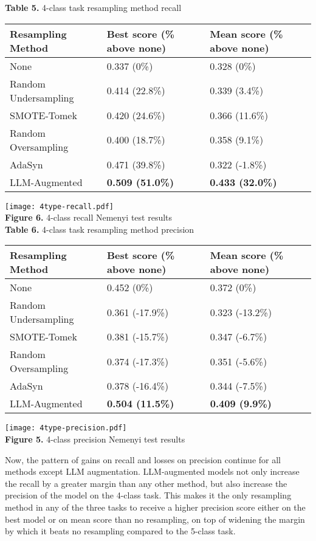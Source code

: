 \documentclass[runningheads]{llncs}
\newenvironment{nscenter}
 {\parskip=0pt\par\nopagebreak\centering}
 {\par\noindent\ignorespacesafterend}
\begin{document}
\begin{nscenter}
{\bf Table 5.} 4-class task resampling method recall\\

\begin{tabular}{|l|l|l|}
\hline
Resampling Method & Best score (\% above none) & Mean score (\% above none) \\\hline
None & 0.337 (0\%) & 0.328 (0\%) \\\hline
Random Undersampling & 0.414 (22.8\%) & 0.339 (3.4\%) \\\hline
SMOTE-Tomek & 0.420 (24.6\%) & 0.366 (11.6\%) \\\hline
Random Oversampling & 0.400 (18.7\%) & 0.358 (9.1\%) \\\hline
AdaSyn & 0.471 (39.8\%) & 0.322 (-1.8\%) \\\hline
LLM-Augmented & {\bf 0.509 (51.0\%)} & {\bf 0.433 (32.0\%)} \\\hline
\end{tabular}

\texttt{[image: 4type-recall.pdf]}\\
{\bf Figure 6.} 4-class recall Nemenyi test results\\
\vspace{\baselineskip}
{\bf Table 6.} 4-class task resampling method precision\\

\begin{tabular}{|l|l|l|}
\hline
Resampling Method & Best score (\% above none) & Mean score (\% above none) \\\hline
None & 0.452 (0\%) & 0.372 (0\%) \\\hline
Random Undersampling & 0.361 (-17.9\%) & 0.323 (-13.2\%) \\\hline
SMOTE-Tomek & 0.381 (-15.7\%) & 0.347 (-6.7\%) \\\hline
Random Oversampling & 0.374 (-17.3\%) & 0.351 (-5.6\%) \\\hline
AdaSyn & 0.378 (-16.4\%) & 0.344 (-7.5\%) \\\hline
LLM-Augmented & {\bf 0.504 (11.5\%)} & {\bf 0.409 (9.9\%)} \\\hline
\end{tabular}

\texttt{[image: 4type-precision.pdf]}\\
{\bf Figure 5.} 4-class precision Nemenyi test results
\end{nscenter}
Now, the pattern of gains on recall and losses on precision continue for all methods except LLM augmentation. LLM-augmented models not only increase the recall by a greater margin than any other method, but also increase the precision of the model on the 4-class task. This makes it the only resampling method in any of the three tasks to receive a higher precision score either on the best model or on mean score than no resampling, on top of widening the margin by which it beats no resampling compared to the 5-class task.
\end{document}
